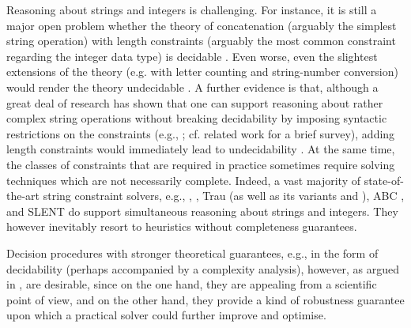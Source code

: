 Reasoning about strings and integers is challenging. For instance, it is still a major open problem whether the theory of concatenation (arguably the simplest string operation) with length constraints (arguably the most common constraint regarding the integer data type) is decidable \cite{Vijay-length}. Even worse, even the slightest extensions of the theory (e.g. with letter counting  and
string-number conversion) would render the theory undecidable \cite{buchi,GB16}. A further evidence is that, although a great deal of research has shown that one can support reasoning about rather complex string operations without breaking decidability by imposing syntactic restrictions on the constraints (e.g., \cite{CCH+18,CHL+19}; cf. related work for a brief survey), adding length constraints would immediately lead to undecidability \cite{CCH+18}. At the same time, the classes of constraints that are required in practice sometimes require solving techniques which are not necessarily complete. %
%
Indeed, a vast majority of  state-of-the-art string constraint solvers, e.g., {\cvc} \cite{cvc4}, {\zthree} \cite{Z3-str3}, Trau \cite{Abdulla17} (as well as its variants {\trauplus} \cite{AbdullaA+19} and {\zthreetrau} \cite{Z3-trau}),  ABC \cite{ABC}, and SLENT \cite{WC+18} do support simultaneous reasoning about strings and integers.
They however inevitably  resort to heuristics without completeness guarantees. 


Decision procedures with stronger theoretical guarantees, e.g., in the form of decidability (perhaps accompanied by a complexity analysis), however, as argued in \cite{CHL+19}, are desirable, since on the one hand, they are appealing from a scientific point of view, and on the other hand, they provide a kind of robustness guarantee upon which a practical solver could further improve and optimise.


